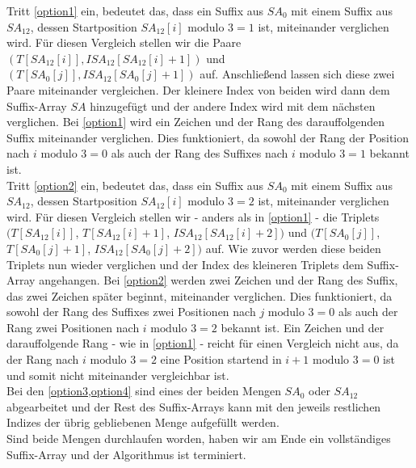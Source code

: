 Tritt \cref{option1} ein, bedeutet das, dass ein Suffix aus $SA_{0}$ mit einem Suffix aus $SA_{12}$, dessen Startposition $SA_{12}[i] \text{ modulo } 3 = 1$ ist, miteinander verglichen wird. Für diesen Vergleich stellen wir die Paare $(T[SA_{12}[i]], ISA_{12}[SA_{12}[i]+1])$ und $(T[SA_{0}[j]], ISA_{12}[SA_{0}[j]+1])$ auf. Anschließend lassen sich diese zwei Paare miteinander vergleichen. Der kleinere Index von beiden wird dann dem Suffix-Array $SA$ hinzugefügt und der andere Index wird mit dem nächsten verglichen. Bei \cref{option1} wird ein Zeichen und der Rang des darauffolgenden Suffix miteinander verglichen. Dies funktioniert, da sowohl der Rang der Position nach $i \text{ modulo } 3 = 0$ als auch der Rang des Suffixes nach $i \text{ modulo } 3 = 1$ bekannt ist. \\
Tritt \cref{option2} ein, bedeutet das, dass ein Suffix aus $SA_{0}$ mit einem Suffix aus $SA_{12}$, dessen Startposition $SA_{12}[i] \text{ modulo } 3 = 2$ ist, miteinander verglichen wird. Für diesen Vergleich stellen wir - anders als in \cref{option1} - die Triplets $(T[SA_{12}[i]]$, $T[SA_{12}[i]+1]$, $ISA_{12}[SA_{12}[i]+2])$ und $(T[SA_{0}[j]]$, $T[SA_{0}[j]+1]$, $ISA_{12}[SA_{0}[j]+2])$ auf. Wie zuvor werden diese beiden Triplets nun wieder verglichen und der Index des kleineren Triplets dem Suffix-Array angehangen. Bei \cref{option2} werden zwei Zeichen und der Rang des Suffix, das zwei Zeichen später beginnt, miteinander verglichen. Dies funktioniert, da sowohl der Rang des Suffixes zwei Positionen nach $j \text{ modulo } 3 = 0$ als auch der Rang zwei Positionen nach $i \text{ modulo } 3 = 2$ bekannt ist. Ein Zeichen und der darauffolgende Rang - wie in \cref{option1} - reicht für einen Vergleich nicht aus, da der Rang nach $i \text{ modulo } 3 = 2$ eine Position startend in $i+1 \text{ modulo } 3 = 0$ ist und somit nicht miteinander vergleichbar ist.\\
Bei den \cref{option3,option4} sind eines der beiden Mengen $SA_{0}$ oder $SA_{12}$ abgearbeitet und der Rest des Suffix-Arrays kann mit den jeweils restlichen Indizes der übrig gebliebenen Menge aufgefüllt werden.\\
Sind beide Mengen durchlaufen worden, haben wir am Ende ein vollständiges Suffix-Array und der Algorithmus ist terminiert.


